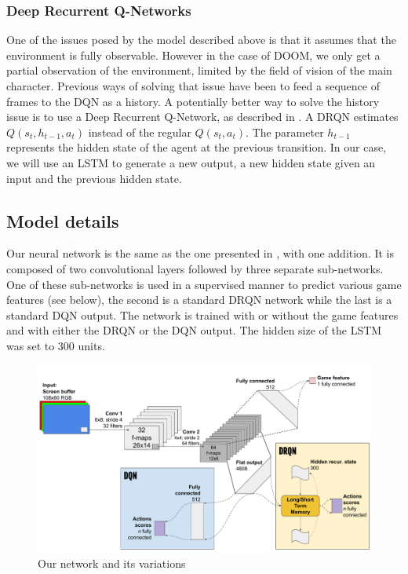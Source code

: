 \documentclass[letterpaper]{article}
\begin{document}
\subsubsection{Deep Recurrent Q-Networks}
One of the issues posed by the model described above is that it assumes that the
environment is fully observable. However in the case of DOOM, we only get a
partial
observation of the environment, limited by the field of vision of the main
character. Previous ways of solving that issue have been to feed a sequence of
frames to the DQN as a history.
A potentially better way to solve the history issue is to use a Deep Recurrent
Q-Network, as described in \citep{Hausknecht2015}. A DRQN
estimates $Q(s_t,h_{t-1},a_t)$ instead of the regular $Q(s_t,a_t)$. The
parameter $h_{t-1}$ represents the hidden state of the agent at the previous
transition. In our case, we will use an LSTM to generate a new output, a new
hidden state given an input and the previous hidden state.

\subsection{Model details}
Our neural network is the same as the one presented in \citep{Lample2016},
with one addition.
It is composed of two convolutional layers followed by three separate
sub-networks. One of these sub-networks is used in a supervised manner to
predict various game features (see below), the second is a standard
DRQN network while the last is a standard DQN output. The network is trained
with or without the game features and with either the DRQN or the DQN output.
The hidden size of the LSTM was set to 300 units.

\begin{figure}[h]
  \includegraphics[width=\textwidth]{DRQNSchema.pdf}
  \caption{\label{fig:drqn-schema} Our network and its variations}
\end{figure}
\end{document}
